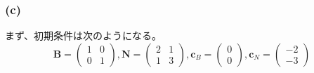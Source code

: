 \documentclass[a4paper,12pt]{jsarticle}
\begin{document}
\subsubsection*{(c)}
まず、初期条件は次のようになる。
\[
  \bm{B}=
  \begin{pmatrix}
    1 & 0 \\
    0 & 1
  \end{pmatrix}
  ,\bm{N}=
  \begin{pmatrix}
    2 & 1 \\
    1 & 3
  \end{pmatrix}
  ,\bm{c}_B=
  \begin{pmatrix}
    0 \\ 0
  \end{pmatrix}
  ,\bm{c}_N=
  \begin{pmatrix}
    -2 \\ -3
  \end{pmatrix}
\]
\end{document}
